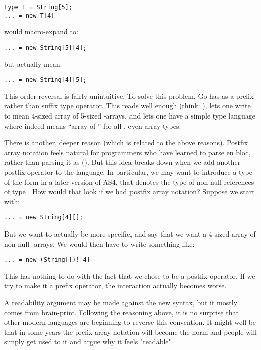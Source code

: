 \begin{verbatim}
type T = String[5];
... = new T[4]
\end{verbatim}

would macro-expand to:

\begin{verbatim}
... = new String[5][4];
\end{verbatim}

but actually mean:

\begin{verbatim}
... = new String[4][5];
\end{verbatim}

This order reversal is fairly unintuitive. To solve this problem,
Go has \code{[]} as a prefix rather than suffix type operator. This reads
well enough (think: ), lets one write  to
mean 4-sized array of 5-sized -arrays, and lets one have a
simple type language where  indeed means ``array of '' for all , even array types.

There is another, deeper reason (which is related to the above
reasons). Postfix array notation feels natural for programmers who have learned
to parse  en bloc, rather than parsing it as
()\code{[5]}. But this idea breaks down when we add another postfix
operator to the language. In particular, we may want to introduce a type of the form  in a later version of AS4, that denotes the type of non-null references of type . How would that look if we had postfix array notation? Suppose we start with:

\begin{verbatim}
... = new String[4][];
\end{verbatim}

But we want to actually be more specific, and say that we want a 4-sized array of non-null -arrays. We would then have to write something like:

\begin{verbatim}
... = new (String[])![4]
\end{verbatim}

This has nothing to do with the fact that we chose \code{!} to be a postfix
operator. If we try to make it a prefix operator, the interaction actually
becomes worse.

A readability argument may be made against the new syntax, but it
mostly comes from brain-print. Following the reasoning above, it is no surprise that other modern languages are beginning to reverse this convention. It might well be that in some years the prefix array notation will become the norm and people will simply get used to it and argue why it feels "readable".

